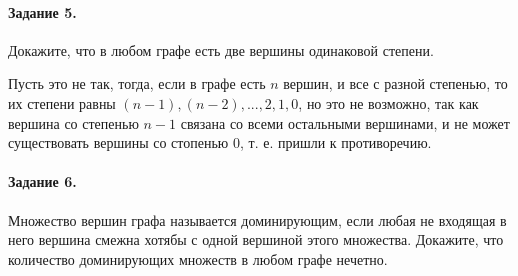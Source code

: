 \documentclass[a4paper,12pt]{article}
\begin{document}
\paragraph{Задание 5.} Докажите, что в любом графе есть две вершины одинаковой степени.
\begin{Solution}
Пусть это не так, тогда, если в графе есть $n$ вершин, и все с разной степенью, то их степени равны $(n-1), (n-2), ... , 2, 1, 0$, но это не возможно, так как вершина со степенью $n-1$ связана со всеми остальными вершинами, и не может существовать вершины со стопенью 0, т. е. пришли к противоречию.
\end{Solution}

\paragraph{Задание 6.} Множество вершин графа называется доминирующим, если любая не входящая в него вершина смежна хотябы с одной вершиной этого множества. Докажите, что количество доминирующих множеств в любом графе нечетно.
\end{document}
